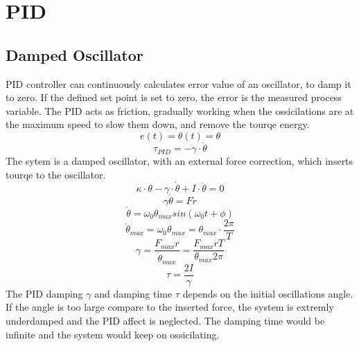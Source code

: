\documentclass[\main/master.tex]{subfiles}
\begin{document}
\section{PID}
\subsection{Damped Oscillator}
PID controller can continuously calculates error value of an oscillator, to damp it to zero. If the defined set point is set to zero, the error is the measured process variable. The PID acts as friction, gradually working when the ossicilations are at the maximum speed to slow them down, and remove the tourqe energy.
\begin{equation}
e(t) = \theta(t) = \theta   \label{eqn:error}
\end{equation}
\begin{equation}
\tau_{PID} = -\gamma\cdot\dot{\theta}   \label{eqn:friction_tourqe}
\end{equation}
The sytem is a damped oscillator, with an external force correction, which inserts tourqe to the oscillator.
\begin{equation}
\kappa\cdot\theta - \gamma\cdot\dot{\theta}  + I\cdot\ddot{\theta} = 0   \label{eqn:damped__pid_motion_equation}
\end{equation}
\begin{equation}
\gamma\dot{\theta}  = Fr   \label{eqn:damped__pid_motion_equation}
\end{equation}
\begin{equation}
\dot{\theta} = \omega_0\theta_{max}sin(\omega_0 t +\phi)    \label{eqn:undamped_motion_equation}
\end{equation}
\begin{equation}
\dot{\theta}_{max} = \omega_0\theta_{max} = \theta_{max}\cdot\frac{2\pi}{T}    \label{eqn:undamped_motion_equation}
\end{equation}
\begin{equation}
\gamma  = \frac{F_{max}r}{\dot{\theta}_{max}} =\frac{F_{max}rT}{\theta_{max}2\pi}    \label{eqn:damped_pid_motion_equation}
\end{equation}
\begin{equation}
\tau =  \frac{2I}{\gamma}  \label{eqn:damping_time}
\end{equation}
The PID damping $\gamma$ and damping time $\tau$ depends on the initial oscillations angle. If the angle is too large compare to the inserted force, the system is extremly underdamped and the PID affect is neglected. The damping time would be infinite and the system would keep on ossicilating.
\end{document}
